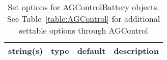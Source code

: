 \begin{table}[ht]
\centering
\begin{tabular}{p{5cm} c c p{7cm}}
\hline
string(s) & type & default & description \\
\hline
\hline
\end{tabular}
\caption{Set options for AGControlBattery objects. See Table~\ref{table:AGControl} for additional settable options through AGControl}
\label{table:AGControlBattery}
\end{table}
